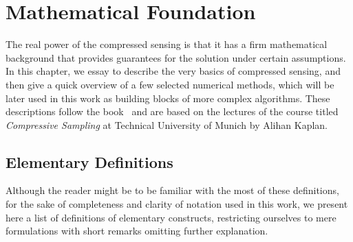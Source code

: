 \chapter{Mathematical Foundation}

The real power of the compressed sensing is that it has a firm mathematical background that provides guarantees for the solution under certain assumptions. In this chapter, we essay to describe the very basics of compressed sensing, and then give a quick overview of a few selected numerical methods, which will be later used in this work as building blocks of more complex algorithms. These descriptions follow the book~\cite{foucart_mathematical_2013} and are based on the lectures of the course titled \textit{Compressive Sampling} at Technical University of Munich by Alihan Kaplan.

\section{Elementary Definitions}

Although the reader might be to be familiar with the most of these definitions, for the sake of completeness and clarity of notation used in this work, we present here a list of definitions of elementary constructs, restricting ourselves to mere formulations with short remarks omitting further explanation.

